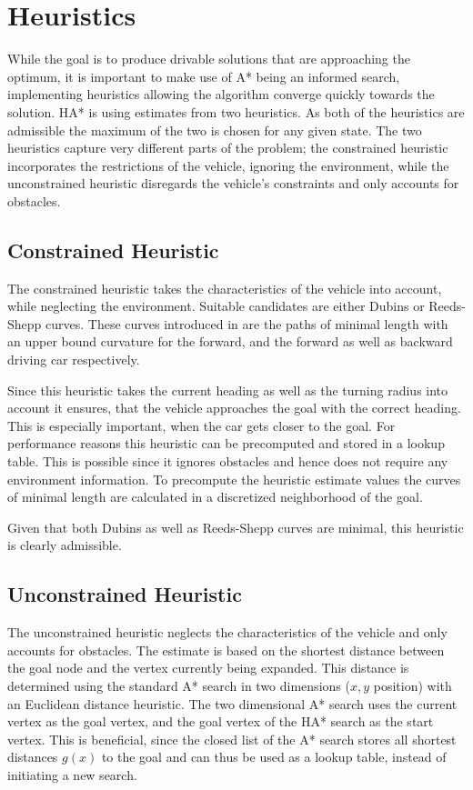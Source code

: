 \section{Heuristics}
While the goal is to produce drivable solutions that are approaching the optimum, it is important to make use of A* being an informed search, implementing heuristics allowing the algorithm converge quickly towards the solution. HA* is using estimates from two heuristics. As both of the heuristics are admissible the maximum of the two is chosen for any given state. The two heuristics capture very different parts of the problem; the constrained heuristic incorporates the restrictions of the vehicle, ignoring the environment, while the unconstrained heuristic disregards the vehicle's constraints and only accounts for obstacles.

\subsection{Constrained Heuristic}
The constrained heuristic takes the characteristics of the vehicle into account, while neglecting the environment. Suitable candidates are either Dubins or Reeds-Shepp curves. These curves introduced in  are the paths of minimal length with an upper bound curvature for the forward, and the forward as well as backward driving car respectively.

Since this heuristic takes the current heading as well as the turning radius into account it ensures, that the vehicle approaches the goal with the correct heading. This is especially important, when the car gets closer to the goal. For performance reasons this heuristic can be precomputed and stored in a lookup table. This is possible since it ignores obstacles and hence does not require any environment information. To precompute the heuristic estimate values the curves of minimal length are calculated in a discretized neighborhood of the goal.

Given that both Dubins as well as Reeds-Shepp curves are minimal, this heuristic is clearly admissible.

\subsection{Unconstrained Heuristic}
The unconstrained heuristic neglects the characteristics of the vehicle and only accounts for obstacles. The estimate is based on the shortest distance between the goal node and the vertex currently being expanded. This distance is determined using the standard A* search in two dimensions ($x,y$ position) with an Euclidean distance heuristic.
The two dimensional A* search uses the current vertex as the goal vertex, and the goal vertex of the HA* search as the start vertex. This is beneficial, since the closed list of the A* search stores all shortest distances $g(x)$ to the goal and can thus be used as a lookup table, instead of initiating a new search.

